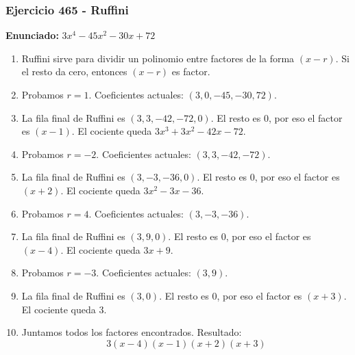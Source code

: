 \documentclass[11pt,a4paper]{article}
\begin{document}
\subsubsection*{Ejercicio 465 - Ruffini}
\textbf{Enunciado:} $ 3 x^{4} - 45 x^{2} - 30 x + 72 $\par
\begin{enumerate}[leftmargin=2em]
\item Ruffini sirve para dividir un polinomio entre factores de la forma \((x-r)\). Si el resto da cero, entonces \((x-r)\) es factor.
\item Probamos \(r=1\). Coeficientes actuales: \((3, 0, -45, -30, 72)\).
\item La fila final de Ruffini es \((3, 3, -42, -72, 0)\). El resto es \(0\), por eso el factor es \((x-1)\). El cociente queda \(3 x^{3} + 3 x^{2} - 42 x - 72\).
\item Probamos \(r=-2\). Coeficientes actuales: \((3, 3, -42, -72)\).
\item La fila final de Ruffini es \((3, -3, -36, 0)\). El resto es \(0\), por eso el factor es \((x+2)\). El cociente queda \(3 x^{2} - 3 x - 36\).
\item Probamos \(r=4\). Coeficientes actuales: \((3, -3, -36)\).
\item La fila final de Ruffini es \((3, 9, 0)\). El resto es \(0\), por eso el factor es \((x-4)\). El cociente queda \(3 x + 9\).
\item Probamos \(r=-3\). Coeficientes actuales: \((3, 9)\).
\item La fila final de Ruffini es \((3, 0)\). El resto es \(0\), por eso el factor es \((x+3)\). El cociente queda \(3\).
\item Juntamos todos los factores encontrados. Resultado: \[\boxed{3 \left(x - 4\right) \left(x - 1\right) \left(x + 2\right) \left(x + 3\right)}\]
\end{enumerate}

\vspace{0.2cm}
\end{document}
